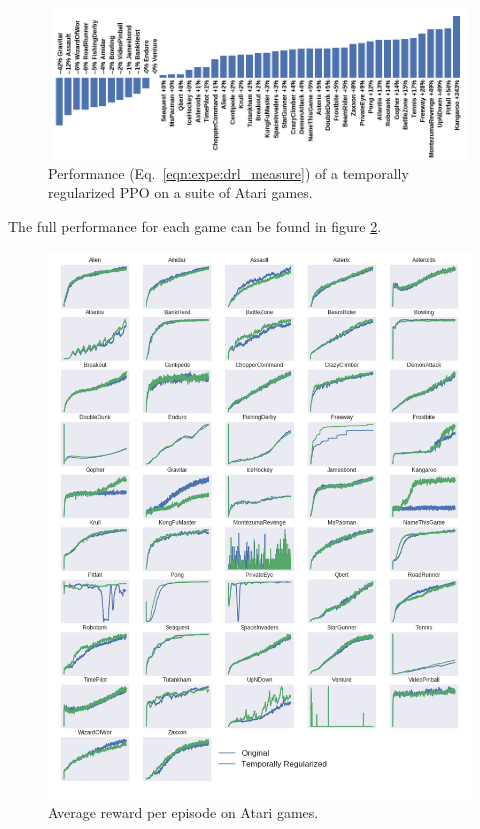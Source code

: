 \begin{figure}
    \centering
    \includegraphics[width=13cm,height=4cm]{./fig/bar_atari.png}
    \caption{Performance (Eq.~\ref{eqn:expe:drl_measure}) of a temporally regularized PPO on a suite of Atari games.}
    \label{fig:graph_atari}
\end{figure}
The full performance for each game can be found in figure \ref{fig:my_label}.
\begin{figure}
    \centering
    \includegraphics[scale=0.5]{./fig/plot_atari.png}
    \caption{Average reward per episode on Atari games.}
    \label{fig:my_label}
\end{figure}


